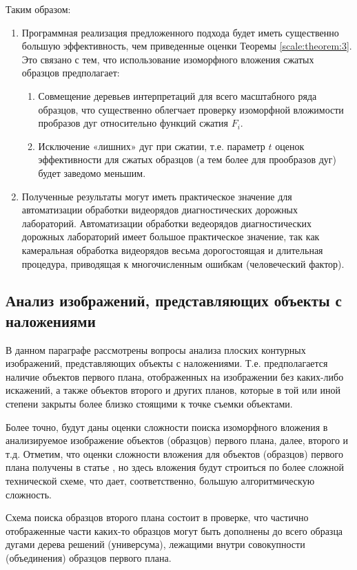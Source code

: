 Таким образом:
\begin{enumerate}
\item  Программная реализация предложенного подхода будет иметь существенно большую эффективность, чем приведенные оценки  Теоремы \ref{scale:theorem:3}. Это связано с тем, что использование изоморфного вложения сжатых образцов предполагает:
\begin{enumerate}
\item Совмещение деревьев интерпретаций для всего масштабного ряда образцов, что существенно облегчает проверку изоморфной вложимости пробразов дуг относительно функций сжатия $F_i$. 
\item Исключение «лишних» дуг при сжатии, т.е. параметр $t$ оценок эффективности  для сжатых образцов (а тем более для прообразов дуг) будет заведомо меньшим.  
\end{enumerate}
\item Полученные результаты могут иметь практическое значение для автоматизации обработки видеорядов диагностических дорожных лабораторий.  Автоматизации обработки ведеорядов диагностических дорожных лабораторий имеет большое практическое значение, так как камеральная обработка видеорядов весьма дорогостоящая и длительная процедура, приводящая к многочисленным ошибкам (человеческий фактор).  
\end{enumerate}


\subsection{Анализ изображений, представляющих объекты с наложениями}

В данном параграфе рассмотрены вопросы анализа плоских контурных изображений, представляющих объекты с наложениями. Т.е. предполагается наличие объектов первого плана, отображенных на изображении без каких-либо искажений,  а также объектов второго и других планов, которые в той или иной степени закрыты более близко стоящими к точке съемки объектами.

Более точно, будут даны оценки сложности поиска изоморфного вложения в анализируемое изображение объектов (образцов) первого плана, далее, второго и т.д. Отметим, что оценки сложности вложения для объектов (образцов) первого плана получены в статье  \cite{D8}, но здесь вложения будут строиться по более сложной технической схеме, что дает, соответственно,  большую алгоритмическую сложность.

Схема поиска образцов второго плана состоит в проверке, что частично отображенные части каких-то образцов могут быть дополнены до всего образца дугами дерева решений (универсума), лежащими внутри  совокупности (объединения) образцов первого плана.

